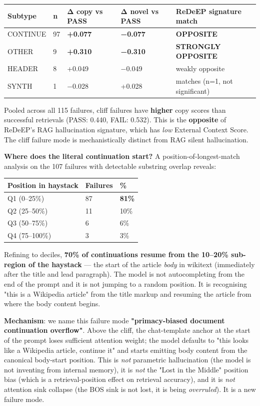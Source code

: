 \documentclass[11pt]{article}
\begin{document}
\begin{center}
\begin{tabular}{lllll}
\toprule
Subtype & n & Δ copy vs PASS & Δ novel vs PASS & ReDeEP signature match \\
\midrule
CONTINUE & 97 & \textbf{+0.077} & \textbf{−0.077} & \textbf{OPPOSITE} \\
OTHER & 9 & \textbf{+0.310} & \textbf{−0.310} & \textbf{STRONGLY OPPOSITE} \\
HEADER & 8 & +0.049 & −0.049 & weakly opposite \\
SYNTH & 1 & −0.028 & +0.028 & matches (n=1, not significant) \\
\bottomrule
\end{tabular}
\end{center}


Pooled across all 115 failures, cliff failures have \textbf{higher} copy scores than successful retrievals (PASS: 0.440, FAIL: 0.532). This is the \textbf{opposite} of ReDeEP's RAG hallucination signature, which has \textit{low} External Context Score. The cliff failure mode is mechanistically distinct from RAG silent hallucination.


\textbf{Where does the literal continuation start?} A position-of-longest-match analysis on the 107 failures with detectable substring overlap reveals:


\begin{center}
\begin{tabular}{lll}
\toprule
Position in haystack & Failures & \% \\
\midrule
Q1 (0–25\%) & 87 & \textbf{81\%} \\
Q2 (25–50\%) & 11 & 10\% \\
Q3 (50–75\%) & 6 & 6\% \\
Q4 (75–100\%) & 3 & 3\% \\
\bottomrule
\end{tabular}
\end{center}


Refining to deciles, \textbf{70\% of continuations resume from the 10–20\% sub-region of the haystack} — the start of the article \textit{body} in wikitext (immediately after the title and lead paragraph). The model is not autocompleting from the end of the prompt and it is not jumping to a random position. It is recognising "this is a Wikipedia article" from the title markup and resuming the article from where the body content begins.


\textbf{Mechanism}: we name this failure mode \textbf{"primacy-biased document continuation overflow"}. Above the cliff, the chat-template anchor at the start of the prompt loses sufficient attention weight; the model defaults to "this looks like a Wikipedia article, continue it" and starts emitting body content from the canonical body-start position. This is \textit{not} parametric hallucination (the model is not inventing from internal memory), it is \textit{not} the "Lost in the Middle" position bias (which is a retrieval-position effect on retrieval accuracy), and it is \textit{not} attention sink collapse (the BOS sink is not lost, it is being \textit{overruled}). It is a new failure mode.
\end{document}
